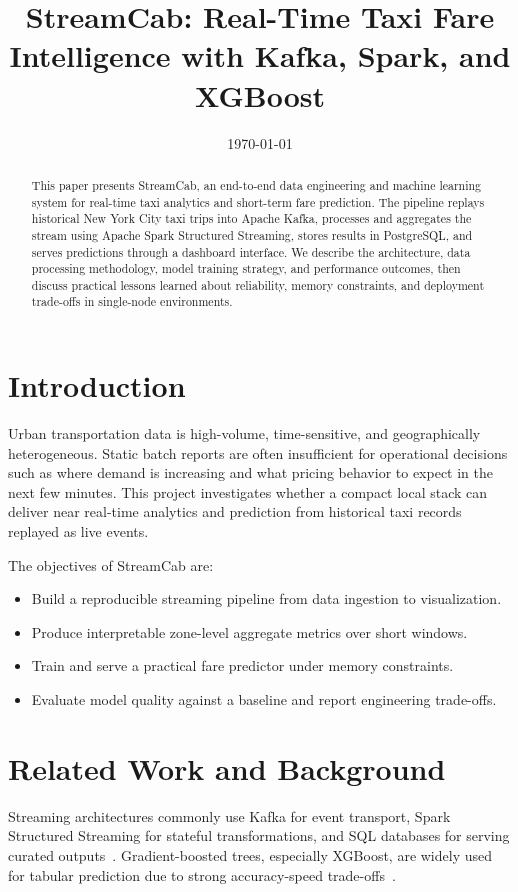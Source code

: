 \documentclass[conference]{IEEEtran}
\title{StreamCab: Real-Time Taxi Fare Intelligence with Kafka, Spark, and XGBoost}
\author{%
\IEEEauthorblockN{Bibek Dhungana, Xiaodi Shao, Raivath Mallela}
\IEEEauthorblockA{Big Data Application}
}
\date{\today}
\begin{document}
\maketitle

\begin{abstract}
This paper presents StreamCab, an end-to-end data engineering and machine learning system for real-time taxi analytics and short-term fare prediction. The pipeline replays historical New York City taxi trips into Apache Kafka, processes and aggregates the stream using Apache Spark Structured Streaming, stores results in PostgreSQL, and serves predictions through a dashboard interface. We describe the architecture, data processing methodology, model training strategy, and performance outcomes, then discuss practical lessons learned about reliability, memory constraints, and deployment trade-offs in single-node environments.
\end{abstract}

\section{Introduction}
Urban transportation data is high-volume, time-sensitive, and geographically heterogeneous. Static batch reports are often insufficient for operational decisions such as where demand is increasing and what pricing behavior to expect in the next few minutes. This project investigates whether a compact local stack can deliver near real-time analytics and prediction from historical taxi records replayed as live events.

The objectives of StreamCab are:
\begin{itemize}[leftmargin=1.5em]
    \item Build a reproducible streaming pipeline from data ingestion to visualization.
    \item Produce interpretable zone-level aggregate metrics over short windows.
    \item Train and serve a practical fare predictor under memory constraints.
    \item Evaluate model quality against a baseline and report engineering trade-offs.
\end{itemize}

\section{Related Work and Background}
Streaming architectures commonly use Kafka for event transport, Spark Structured Streaming for stateful transformations, and SQL databases for serving curated outputs~\cite{kafka,spark}. Gradient-boosted trees, especially XGBoost, are widely used for tabular prediction due to strong accuracy-speed trade-offs~\cite{xgboost}.
\end{document}
